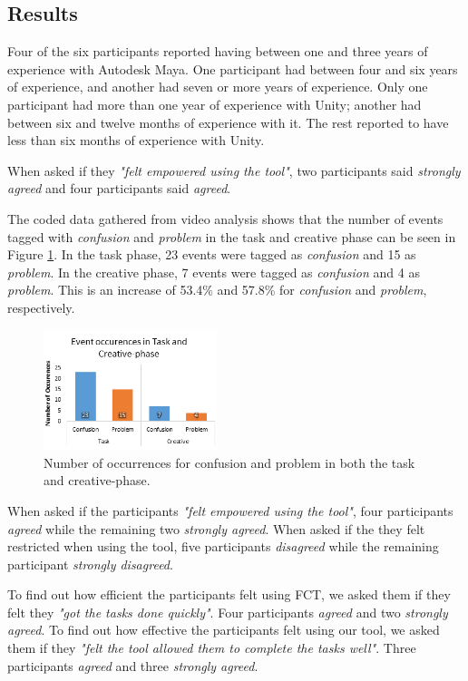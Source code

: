 \subsection{Results} \label{results}
Four of the six participants reported having between one and three years of experience with Autodesk Maya. One participant had between four and six years of experience, and another had seven or more years of experience. Only one participant had more than one year of experience with Unity; another had between six and twelve months of experience with it. The rest reported to have less than six months of experience with Unity.

When asked if they \textit{"felt empowered using the tool"}, two participants said \textit{strongly agreed} and four participants said \textit{agreed}.

The coded data gathered from video analysis shows that the number of events tagged with \textit{confusion} and \textit{problem} in the task and creative phase can be seen in Figure \ref{fig:codedgraph}. In the task phase, 23 events were tagged as \textit{confusion} and 15 as \textit{problem}. In the creative phase, 7 events were tagged as \textit{confusion} and 4 as \textit{problem}. This is an increase of 53.4\% and 57.8\% for \textit{confusion} and \textit{problem}, respectively.

\begin{figure}[htbp]
\centering
\includegraphics[width=0.45\textwidth]{Pics/codedgraph2}
\caption{Number of occurrences for confusion and problem in both the task and creative-phase.}
\label{fig:codedgraph}
\end{figure}

When asked if the participants \textit{"felt empowered using the tool"}, four participants \textit{agreed} while the remaining two \textit{strongly agreed}. When asked if the they felt restricted when using the tool, five participants \textit{disagreed} while the remaining participant \textit{strongly disagreed}.

To find out how efficient the participants felt using FCT, we asked them if they felt they \textit{"got the tasks done quickly"}. Four participants \textit{agreed} and two \textit{strongly agreed}. To find out how effective the participants felt using our tool, we asked them if they \textit{"felt the tool allowed them to complete the tasks well"}. Three participants \textit{agreed} and three \textit{strongly agreed}.


